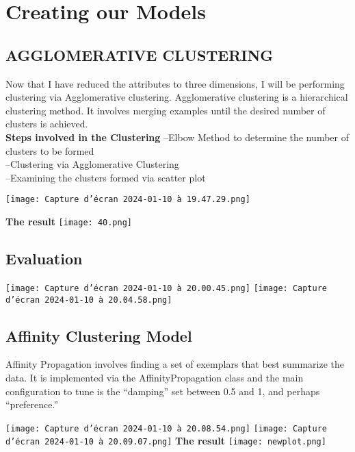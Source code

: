 \documentclass[12pt,a4paper]{report}
\begin{document}
\chapter{Creating our Models}
\section{AGGLOMERATIVE CLUSTERING}
Now that I have reduced the attributes to three dimensions, I will be performing clustering via Agglomerative clustering. Agglomerative clustering is a hierarchical clustering method. It involves merging examples until the desired number of clusters is achieved.\\
\textbf{Steps involved in the Clustering}
--Elbow Method to determine the number of clusters to be formed\\
--Clustering via Agglomerative Clustering\\
--Examining the clusters formed via scatter plot\\
\begin{center}
    \texttt{[image: Capture d’écran 2024-01-10 à 19.47.29.png]}
   
   
\end{center} 
\begin{center}
    \textbf{The result}
  \texttt{[image: 40.png]} 
   
\end{center} 
\section{Evaluation}
\begin{center}
    \texttt{[image: Capture d’écran 2024-01-10 à 20.00.45.png]}
   \texttt{[image: Capture d’écran 2024-01-10 à 20.04.58.png]}
   
\end{center} 

\section{Affinity Clustering Model}
Affinity Propagation involves finding a set of exemplars that best summarize the data. It is implemented via the AffinityPropagation class and the main configuration to tune is the “damping” set between 0.5 and 1, and perhaps “preference.”\\
\begin{center}
    \texttt{[image: Capture d’écran 2024-01-10 à 20.08.54.png]}
     \texttt{[image: Capture d’écran 2024-01-10 à 20.09.07.png]}
   \textbf{The result}
   \texttt{[image: newplot.png]}
\end{center} 
\end{document}
